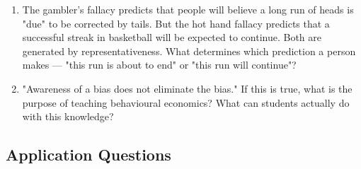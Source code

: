 \documentclass[12pt, letterpaper]{article}
\begin{document}
\begin{enumerate}
\item The gambler's fallacy predicts that people will believe a long run of heads is "due" to be corrected by tails. But the hot hand fallacy predicts that a successful streak in basketball will be expected to continue. Both are generated by representativeness. What determines which prediction a person makes --- "this run is about to end" or "this run will continue"?

\item "Awareness of a bias does not eliminate the bias." If this is true, what is the purpose of teaching behavioural economics? What can students actually do with this knowledge?
\end{enumerate}


\subsection{Application Questions}
\end{document}
